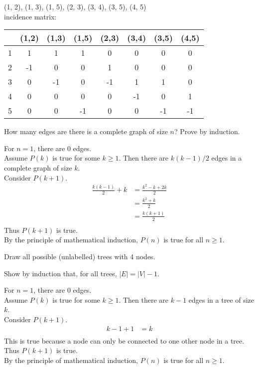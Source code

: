 \documentclass[solutionorbox,answers]{exam}
\begin{document}
\begin{questions}
\begin{minipage}{0.6\linewidth}
\begin{solutionbox}{4in}
  (1, 2), (1, 3), (1, 5), (2, 3), (3, 4), (3, 5), (4, 5)                                               \\
  incidence matrix: \\
  \begin{tabular}{c|ccccccc}
    & (1,2) & (1,3) & (1,5) & (2,3) & (3,4) & (3,5) & (4,5) \\
    \hline
    1 & 1 & 1 & 1 & 0 & 0 & 0 & 0 \\
    2 & -1 & 0 & 0 & 1 & 0 & 0 & 0 \\
    3 & 0 & -1 & 0 & -1 & 1 & 1 & 0 \\
    4 & 0 & 0 & 0 & 0 & -1 & 0 & 1 \\
    5 & 0 & 0 & -1 & 0 & 0 & -1 & -1 \\
  \end{tabular}   
\end{solutionbox}
\end{minipage}
\question
How many edges are there is a complete graph of size $n$? Prove by induction.

\begin{solutionbox}{3.8in}
  For $n = 1$, there are 0 edges. \\
  Assume $P(k)$ is true for some $k \ge 1$. Then there are $k(k-1)/2$ edges in a complete graph of size $k$. \\
  Consider $P(k+1)$. \\
  \begin{align*}
    \frac{k(k-1)}{2} + k &= \frac{k^2 - k + 2k}{2} \\
    &= \frac{k^2 + k}{2} \\
    &= \frac{k(k+1)}{2} \\
  \end{align*}
  Thus $P(k+1)$ is true. \\
  By the principle of mathematical induction, $P(n)$ is true for all $n \ge 1$.
\end{solutionbox}

\question
Draw all possible (unlabelled) trees with 4 nodes.

\begin{solutionbox}{3.8in}

\end{solutionbox}

\question
Show by induction that, for all trees, $|E| = |V| - 1$.

\begin{solutionbox}{3.8in}
  For $n = 1$, there are 0 edges. \\
  Assume $P(k)$ is true for some $k \ge 1$. Then there are $k-1$ edges in a tree of size $k$. \\
  Consider $P(k+1)$. \\
  \begin{align*}
    k-1 + 1 &= k \\
  \end{align*}
  This is true because a node can only be connected to one other node in a tree. 
  Thus $P(k+1)$ is true. \\
  By the principle of mathematical induction, $P(n)$ is true for all $n \ge 1$.
\end{solutionbox}


\end{questions}
\end{document}
